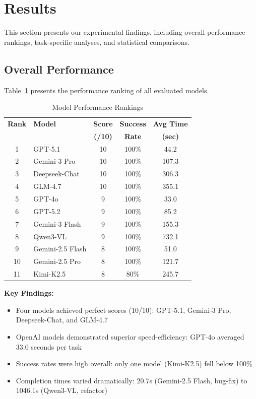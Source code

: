 \section{Results}
\label{sec:results}

This section presents our experimental findings, including overall performance rankings, task-specific analyses, and statistical comparisons.

\subsection{Overall Performance}
\label{sec:overall}

Table~\ref{tab:rankings} presents the performance ranking of all evaluated models.

\begin{table}[htbp]
\centering
\caption{Model Performance Rankings}
\label{tab:rankings}
\begin{tabular}{clccc}
\toprule
\textbf{Rank} & \textbf{Model} & \textbf{Score} & \textbf{Success} & \textbf{Avg Time} \\
& & \textbf{(/10)} & \textbf{Rate} & \textbf{(sec)} \\
\midrule
1 & GPT-5.1 & 10 & 100\% & 44.2 \\
2 & Gemini-3 Pro & 10 & 100\% & 107.3 \\
3 & Deepseek-Chat & 10 & 100\% & 306.3 \\
4 & GLM-4.7 & 10 & 100\% & 355.1 \\
5 & GPT-4o & 9 & 100\% & 33.0 \\
6 & GPT-5.2 & 9 & 100\% & 85.2 \\
7 & Gemini-3 Flash & 9 & 100\% & 155.3 \\
8 & Qwen3-VL & 9 & 100\% & 732.1 \\
9 & Gemini-2.5 Flash & 8 & 100\% & 51.0 \\
10 & Gemini-2.5 Pro & 8 & 100\% & 121.7 \\
11 & Kimi-K2.5 & 8 & 80\% & 245.7 \\
\bottomrule
\end{tabular}
\end{table}

\textbf{Key Findings:}
\begin{itemize}
    \item Four models achieved perfect scores (10/10): GPT-5.1, Gemini-3 Pro, Deepseek-Chat, and GLM-4.7
    \item OpenAI models demonstrated superior speed-efficiency: GPT-4o averaged 33.0 seconds per task
    \item Success rates were high overall: only one model (Kimi-K2.5) fell below 100\%
    \item Completion times varied dramatically: 20.7s (Gemini-2.5 Flash, bug-fix) to 1046.1s (Qwen3-VL, refactor)
\end{itemize}

